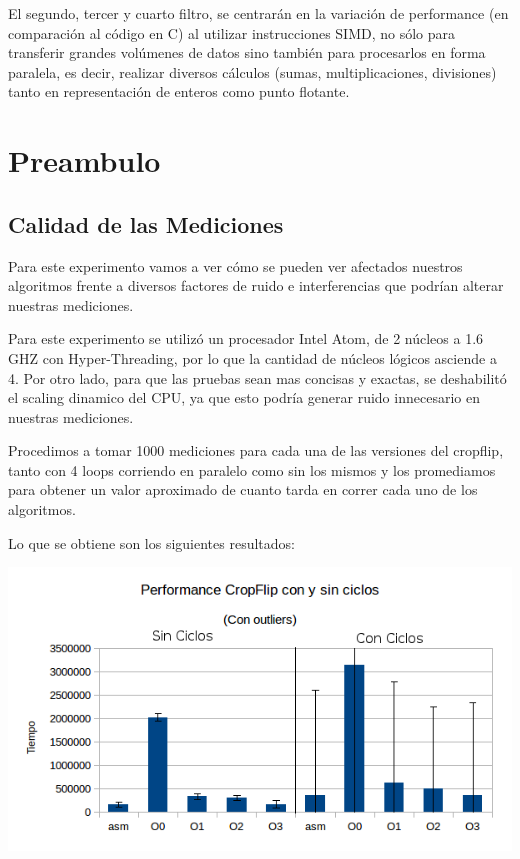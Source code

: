 \documentclass[a4paper]{article}
\begin{document}
El segundo, tercer y cuarto filtro, se centrarán en la variación de performance (en comparación al código en C) al utilizar instrucciones SIMD, no sólo para transferir grandes volúmenes de datos sino también para procesarlos en forma paralela, es decir, realizar diversos cálculos (sumas, multiplicaciones, divisiones) tanto en representación de enteros como punto flotante.

\section{Preambulo}

\subsection{Calidad de las Mediciones}
Para este experimento vamos a ver cómo se pueden ver afectados nuestros algoritmos frente a diversos factores de ruido e interferencias que podrían alterar nuestras mediciones.

Para este experimento se utilizó un procesador Intel Atom, de 2 núcleos a 1.6 GHZ con Hyper-Threading, por lo que la cantidad de núcleos lógicos asciende a 4. Por otro lado, para que las pruebas sean mas concisas y exactas, se deshabilitó el scaling dinamico del CPU, ya que esto podría generar ruido innecesario en nuestras mediciones.

Procedimos a tomar 1000 mediciones para cada una de las versiones del cropflip, tanto con 4 loops corriendo en paralelo como sin los mismos y los promediamos para obtener un valor aproximado de cuanto tarda en correr cada uno de los algoritmos.

Lo que se obtiene son los siguientes resultados:

\newpage

  \includegraphics[scale=0.66]{Graficos1.4/1.3/perConOut.png}
\end{document}
